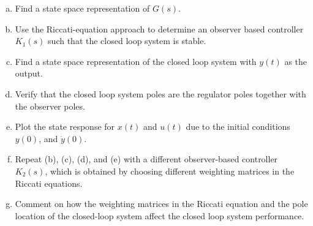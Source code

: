 \documentclass{article}
\begin{document}
\begin{enumerate}[(a)]
\item Find a state space representation of $G(s)$.
\newline

\item Use the Riccati-equation approach to determine an observer based controller $K_1(s)$ such that the closed loop system is stable.
\newline

\item Find a state space representation of the closed loop system with $y(t)$ as the output.
\newline

\item Verify that the closed loop system poles are the regulator poles together with the observer poles.
\newline

\item Plot the state response for $x(t)$ and $u(t)$ due to the initial conditions $y(0)$, and $\dot{y}(0)$.
\newline

\item Repeat (b), (c), (d), and (e) with a different observer-based controller $K_2(s)$, which is obtained by choosing different weighting matrices in the Riccati equations.
\newline

\item Comment on how the weighting matrices in the Riccati equation and the pole location of the closed-loop system affect the closed loop system performance.
\newline

\end{enumerate}
\end{document}
